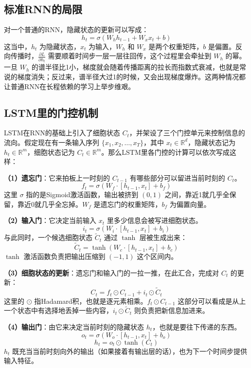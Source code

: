 \documentclass[12pt,a4paper,oneside]{ctexbook}
\begin{document}
	\subsection{标准RNN的局限}
	
	对一个普通的RNN，隐藏状态的更新可以写成：
	\[
	h_t = \sigma(W_h h_{t-1} + W_x x_t + b)
	\]
	这当中，$h_t$ 为隐藏状态，$x_t$ 为输入，$W_h$ 和 $W_x$ 是两个权重矩阵，$b$ 是偏置。反向传播时，$\frac{\partial L}{\partial h_t}$ 需要顺着时间步一层一层往回传，这个过程里会牵扯到 $W_h$ 的幂。一旦 $W_h$ 的谱半径比1小，梯度就会随着传播距离的拉长而指数式衰减，也就是常说的梯度消失；反过来，谱半径大过1的时候，又会出现梯度爆炸。这两种情况都让普通RNN在长程依赖的学习上举步维艰。
	
	\subsection{LSTM里的门控机制}
	
	LSTM在RNN的基础上引入了细胞状态 $C_t$，并架设了三个门控单元来控制信息的流向。假定现在有一条输入序列 $\{x_1, x_2, \ldots, x_T\}$，其中 $x_t \in \mathbb{R}^{d}$，隐藏状态记为 $h_t \in \mathbb{R}^{m}$，细胞状态记为 $C_t \in \mathbb{R}^{m}$。那么LSTM里各门控的计算可以依次写成这样：
	
	\textbf{（1）遗忘门}：它来拍板上一时刻的 $C_{t-1}$ 有哪些部分可以留进当前时刻的 $C_t$。
	\[
	f_t = \sigma(W_f \cdot [h_{t-1}, x_t] + b_f)
	\]
	这里 $\sigma$ 指的是Sigmoid激活函数，输出被挤到 $(0,1)$ 之间，靠近1就几乎全保留，靠近0就几乎全忘掉。$W_f$ 是遗忘门的权重矩阵，$b_f$ 为偏置向量。
	
	\textbf{（2）输入门}：它决定当前输入 $x_t$ 里多少信息会被写进细胞状态。
	\[
	i_t = \sigma(W_i \cdot [h_{t-1}, x_t] + b_i)
	\]
	与此同时，一个候选细胞状态 $\tilde{C}_t$ 通过 $\tanh$ 层被生成出来：
	\[
	\tilde{C}_t = \tanh(W_c \cdot [h_{t-1}, x_t] + b_c)
	\]
	$\tanh$ 激活函数负责把输出压缩到 $(-1, 1)$ 这个区间内。
	
	\textbf{（3）细胞状态的更新}：遗忘门和输入门的一拉一推，在此汇合，完成对 $C_t$ 的更新：
	\[
	C_t = f_t \odot C_{t-1} + i_t \odot \tilde{C}_t
	\]
	这里的 $\odot$ 指Hadamard积，也就是逐元素相乘。$f_t \odot C_{t-1}$ 这部分可以看成是从上一个状态中有选择地丢掉一些内容，$i_t \odot \tilde{C}_t$ 则负责把新信息加进来。
	
	\textbf{（4）输出门}：由它来决定当前时刻的隐藏状态 $h_t$，也就是要往下传递的东西。
	\[
	o_t = \sigma(W_o \cdot [h_{t-1}, x_t] + b_o)
	\]
	\[
	h_t = o_t \odot \tanh(C_t)
	\]
	$h_t$ 既充当当前时刻向外的输出（如果接着有输出层的话），也为下一个时间步提供输入特征。
	
\end{document}
